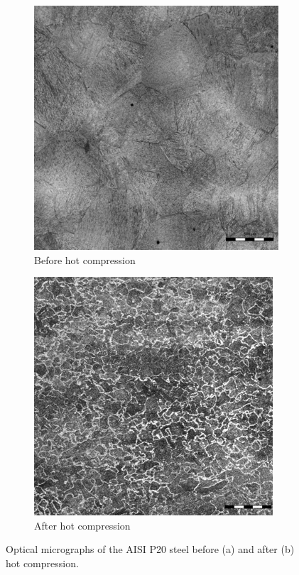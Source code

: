 \documentclass[twoside,english,1p,final,sort&compress]{elsarticle}
\theoremstyle{plain}
\begin{document}
\begin{figure}[!ht]
\centering
\begin{subfigure}[b]{0.45\columnwidth}
\centering
\includegraphics[width=\columnwidth]{Figures/BeforeCompM}
\caption{Before hot compression}
\end{subfigure}
\hfill
\begin{subfigure}[b]{0.45\columnwidth}
\centering
\includegraphics[width=\columnwidth]{Figures/AfterCompM}
\caption{After hot compression}
\end{subfigure}
\caption{Optical micrographs of the AISI P20 steel before (a) and after (b) hot compression.}
\label{fig:Micrography}
\end{figure}
\end{document}
